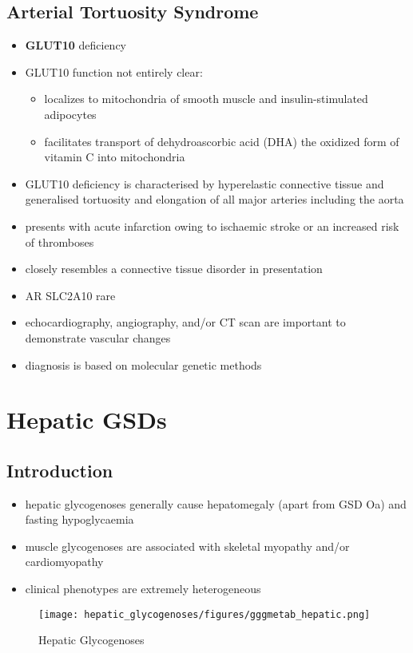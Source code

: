 \documentclass[12pt]{scrartcl}
\begin{document}
\subsection{Arterial Tortuosity Syndrome}
\label{sec:org62ae853}
\begin{itemize}
\item \textbf{GLUT10} deficiency
\item GLUT10 function not entirely clear:
\begin{itemize}
\item localizes to mitochondria of smooth muscle and insulin-stimulated adipocytes
\item facilitates transport of dehydroascorbic acid (DHA) the
oxidized form of vitamin C into mitochondria
\end{itemize}
\item GLUT10 deficiency is characterised by hyperelastic connective tissue
and generalised tortuosity and elongation of all major arteries
including the aorta
\item presents with acute infarction owing to ischaemic stroke or an
increased risk of thromboses
\item closely resembles a connective tissue disorder in presentation
\item AR SLC2A10 rare
\item echocardiography, angiography, and/or CT scan are important to demonstrate vascular changes
\item diagnosis is based on molecular genetic methods
\end{itemize}
\section{Hepatic GSDs}
\label{sec:orgb399b28}
\subsection{Introduction}
\label{sec:org3d2e143}
\begin{itemize}
\item hepatic glycogenoses generally cause hepatomegaly (apart from GSD
Oa) and fasting hypoglycaemia
\item muscle glycogenoses are associated with skeletal myopathy and/or
cardiomyopathy
\item clinical phenotypes are extremely heterogeneous
\end{itemize}

\begin{figure}[htbp]
\centering
\texttt{[image: hepatic\_glycogenoses/figures/gggmetab\_hepatic.png]}
\caption{\label{fig:org343e125}Hepatic Glycogenoses}
\end{figure}
\end{document}
